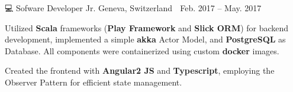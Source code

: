 {\begin{cventries}

        {💻 Sofware Developer Jr.} %
        {Geneva, Switzerland 📍} %
        {Feb. 2017 – May. 2017 📆} %
        {\begin{cvitems}
                \item {Utilized \textbf{Scala} frameworks (\textbf{Play\! Framework} and \textbf{Slick ORM}) for backend development, implemented a simple \textbf{akka} Actor Model, and \textbf{PostgreSQL} as Database. All components were containerized using custom \textbf{docker} images.}
                \item {Created the frontend with \textbf{Angular2 JS} and \textbf{Typescript}, employing the Observer Pattern for efficient state management.}
                \\
                \newline
            \end{cvitems}
        }





\end{cventries}}
